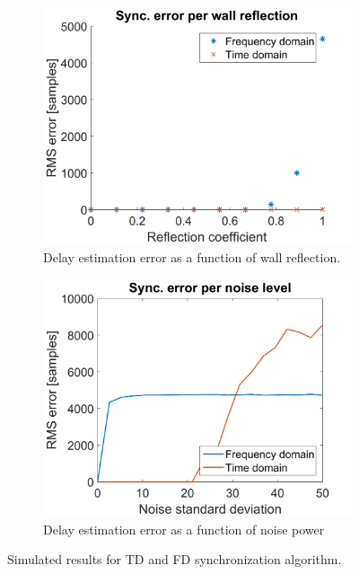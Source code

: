 \documentclass[a4paper, notitlepage]{report}
\begin{document}
\begin{figure}[H]
\begin{adjustwidth}{-1in}{-1in}
\centering
	\begin{subfigure}{0.5\textwidth}
		\includegraphics[width=\textwidth]{figures/sync-simulation/error-vs-reflection}
		\caption{Delay estimation error as a function of wall reflection.}
		\label{fig:sync-simulation-reflection}
	\end{subfigure}
	\begin{subfigure}{0.5\textwidth}
		\includegraphics[width=\textwidth]{figures/sync-simulation/error-vs-noise}
		\caption{Delay estimation error as a function of noise power}
		\label{fig:sync-simulation-noise}
	\end{subfigure}
\end{adjustwidth}
\caption[TD and FD synchronization simulation results.]{Simulated results for TD and FD synchronization algorithm.}
\label{fig:sync-simulation}
\end{figure}
\end{document}
